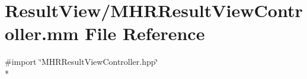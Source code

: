 \hypertarget{_m_h_r_result_view_controller_8mm}{\section{Result\+View/\+M\+H\+R\+Result\+View\+Controller.mm File Reference}
\label{_m_h_r_result_view_controller_8mm}
}
{\ttfamily \#import \char`\"{}M\+H\+R\+Result\+View\+Controller.\+hpp\char`\"{}}\\*
